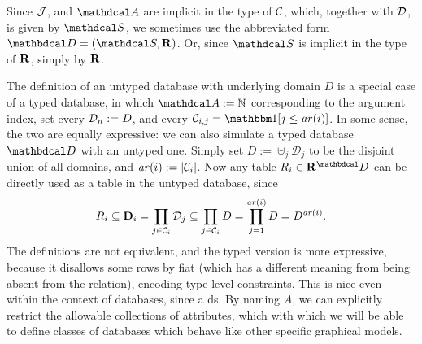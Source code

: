 \documentclass[the-pdg-manual.tex]{subfiles}
\begin{document}
\begin{defn}[database]



	\smallskip
	Since $\mathcal J$, and $\Attrs$ are implicit in the type of $\mathcal C$, which, together with ${\mathcal D}$, is given by $\Sch$,
	we sometimes use the abbreviated form $\D = (\Sch, \Rels)$.  Or, since $\Sch$ is implicit in the type of ${\mathbf R}$, simply by ${\mathbf R}$.
\end{defn}
\medskip

\begin{inactive}
\begin{remark}\label{rem:typed-db-better}
    The definition of an untyped database with underlying domain $D$ is a special case of a typed database, in which $\Attrs := \mathbb N$ corresponding to the argument index, set every ${\mathcal D}_n := D $, and every $\Cols_{i,j} = \mathbbm1[j \le \arity(i)]$.
    In some sense, the two are equally expressive: we can also simulate a typed database $\D$ with an untyped one. Simply set $D := \uplus_j \mathcal D_j$ to be the disjoint union of all domains, and $\mathit{ar}(i) := |\mathcal C_i|$. Now any table $R_i \in \Rels^\D$ can be directly used as a table in the untyped database, since
    \[R_i \subseteq \mathbf D_i = \prod_{j \in \mathcal C_i} \mathcal D_{j}
		\subseteq \prod_{j \in \mathcal C_i} D = \prod_{j = 1}^{\mathit{ar}(i)} D =
        D^{\mathit{ar}(i)} .\]
  	The definitions are not equivalent, and the typed version is more expressive, because it disallows some rows by fiat (which has a different meaning from being absent from the relation), encoding type-level constraints. This is nice even within the context of databases, since a ds. By naming $A$, we can explicitly restrict the  allowable collections of attributes, which with which we will be able to define classes of databases which behave like other specific graphical models.
\end{remark}
\end{inactive}
\end{document}
